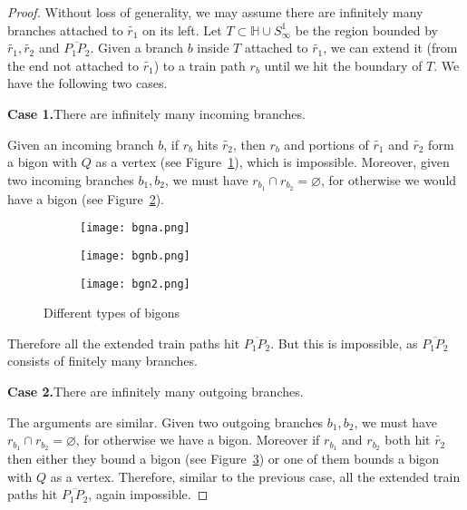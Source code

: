 \documentclass[11pt]{article} %
\theoremstyle{plain}
\theoremstyle{definition}
\numberwithin{equation}{section}
\begin{document}
\begin{proof}

Without loss of generality, we may assume there are infinitely many branches attached to $\widetilde{r_1}$ on its left. Let $T \subset \mathbb{H} \cup S_{\infty}^1$ be the region bounded by $\widetilde{r_1}, \widetilde{r_2}$ and $\overline{P_1P_2}$. Given a branch $b$ inside $T$ attached to $\widetilde{r_1}$, we can extend it (from the end not attached to $\widetilde{r_1}$) to a train path $r_b$ until we hit the boundary of $T$. We have the following two cases.

\noindent\textbf{Case 1.}\quad There are infinitely many incoming branches. 
    
Given an incoming branch $b$, if $r_{b}$ hits $\widetilde{r_2}$, then $r_b$ and portions of $\widetilde{r_1}$ and $\widetilde{r_2}$ form a bigon with $Q$ as a vertex (see Figure~\ref{bgn1.a}), which is impossible. Moreover, given two incoming branches $b_1, b_2$, we must have $r_{b_1} \cap r_{b_2}= \varnothing$, for otherwise we would have a bigon (see Figure~\ref{bgn1.b}). 
\begin{figure}[ht]
\begin{subfigure}{.33\textwidth}
  \centering
  \texttt{[image: bgna.png]}  
  \caption{}
  \label{bgn1.a}
\end{subfigure}
\begin{subfigure}{.33\textwidth}
  \centering
  \texttt{[image: bgnb.png]}  
  \caption{}
  \label{bgn1.b}
\end{subfigure}
\begin{subfigure}{.33\textwidth}
  \centering
  \texttt{[image: bgn2.png]}  
  \caption{}
  \label{bgn2}
\end{subfigure}
\caption{Different types of bigons}
\label{bgn1}
\end{figure}

Therefore all the extended train paths hit $\overline{P_1P_2}$. But this is impossible, as $\overline{P_1P_2}$ consists of finitely many branches.

\noindent\textbf{Case 2.}\quad There are infinitely many outgoing branches.

The arguments are similar. Given two outgoing branches $b_1, b_2$, we must have $r_{b_1} \cap r_{b_2}= \varnothing$, for otherwise we have a bigon. Moreover if $r_{b_1}$ and $r_{b_2}$ both hit $\widetilde{r_2}$ then either they bound a bigon (see Figure~\ref{bgn2}) or one of them bounds a bigon with $Q$ as a vertex. Therefore, similar to the previous case, all the extended train paths hit $\overline{P_1P_2}$, again impossible.
\iffalse
\begin{figure}[ht!]
     \centering
    \texttt{[image: bgn2.png]}
    \caption{Another type of bigons}
    \label{bgn2}
\end{figure}
\fi
\end{proof}
\end{document}
